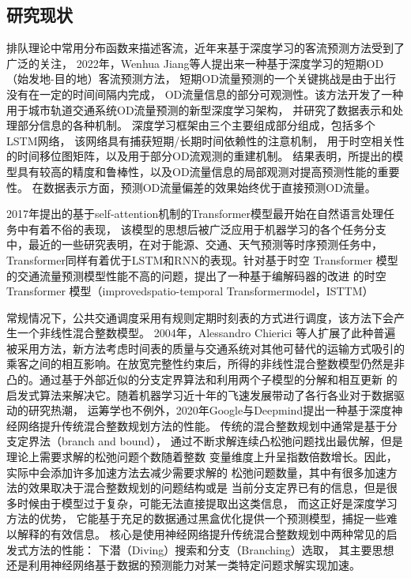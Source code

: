 \subsection{研究现状}
排队理论中常用分布函数来描述客流，近年来基于深度学习的客流预测方法受到了广泛的关注，
2022年，Wenhua Jiang等人提出来一种基于深度学习的短期OD（始发地-目的地）客流预测方法\cite{DLOD2022}，
短期OD流量预测的一个关键挑战是由于出行没有在一定的时间间隔内完成，
OD流量信息的部分可观测性。该方法开发了一种用于城市轨道交通系统OD流量预测的新型深度学习架构，
并研究了数据表示和处理部分信息的各种机制。
深度学习框架由三个主要组成部分组成，包括多个LSTM网络，
该网络具有捕获短期/长期时间依赖性的注意机制，
用于时空相关性的时间移位图矩阵，以及用于部分OD流观测的重建机制。
结果表明，所提出的模型具有较高的精度和鲁棒性，以及OD流量信息的局部观测对提高预测性能的重要性。
在数据表示方面，预测OD流量偏差的效果始终优于直接预测OD流量。


2017年提出的基于self-attention机制的Transformer模型\cite{vaswani2017attention}最开始在自然语言处理任务中有着不俗的表现，
该模型的思想后被广泛应用于机器学习的各个任务分支中，最近的一些研究表明，在对于能源、交通、天气预测等时序预测任务中，
Transformer同样有着优于LSTM和RNN的表现。针对基于时空 Transformer 模型的交通流量预测模型性能不高的问题，提出了一种基于编解码器的改进
的时空 Transformer 模型（improvedspatio-temporal Transformermodel，ISTTM）\cite{transformer2022}


常规情况下，公共交通调度采用有规则定期时刻表的方式进行调度，该方法下会产生一个非线性混合整数模型。
2004年，Alessandro Chierici
等人扩展了此种普遍被采用方法\cite{CHIERICI200499}，新方法考虑时间表的质量与交通系统对其他可替代的运输方式吸引的
乘客之间的相互影响。在放宽完整性约束后，所得的非线性混合整数模型仍然是非
凸的。通过基于外部近似的分支定界算法和利用两个子模型的分解和相互更新
的启发式算法来解决它。随着机器学习近十年的飞速发展带动了各行各业对于数据驱动的研究热潮，
运筹学也不例外，2020年Google与Deepmind提出一种基于深度神经网络提升传统混合整数规划方法的性能\cite{nair2021solving}。
传统的混合整数规划中通常是基于分支定界法（branch and bound），
通过不断求解连续凸松弛问题找出最优解，但是理论上需要求解的松弛问题个数随着整数
变量维度上升呈指数倍数增长。因此，实际中会添加许多加速方法去减少需要求解的
松弛问题数量，其中有很多加速方法的效果取决于混合整数规划的问题结构或是
当前分支定界已有的信息，但是很多时候由于模型过于复杂，可能无法直接提取出这类信息，
而这正好是深度学习方法的优势，
它能基于充足的数据通过黑盒优化提供一个预测模型，捕捉一些难以解释的有效信息。
核心是使用神经网络提升传统混合整数规划中两种常见的启发式方法的性能：
下潜（Diving）搜索和分支（Branching）选取，
其主要思想还是利用神经网络基于数据的预测能力对某一类特定问题求解实现加速。


